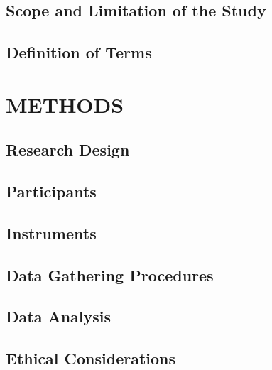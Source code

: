 \documentclass[12pt]{report}
\begin{document}
\section{Scope and Limitation of the Study}

\section{Definition of Terms}

\chapter{METHODS}

\section{Research Design}

\section{Participants}

\section{Instruments}

\section{Data Gathering Procedures}

\section{Data Analysis}

\section{Ethical Considerations}

\printbibliography[
    title = {REFERENCES},
    heading = bibintoc
]
\end{document}
